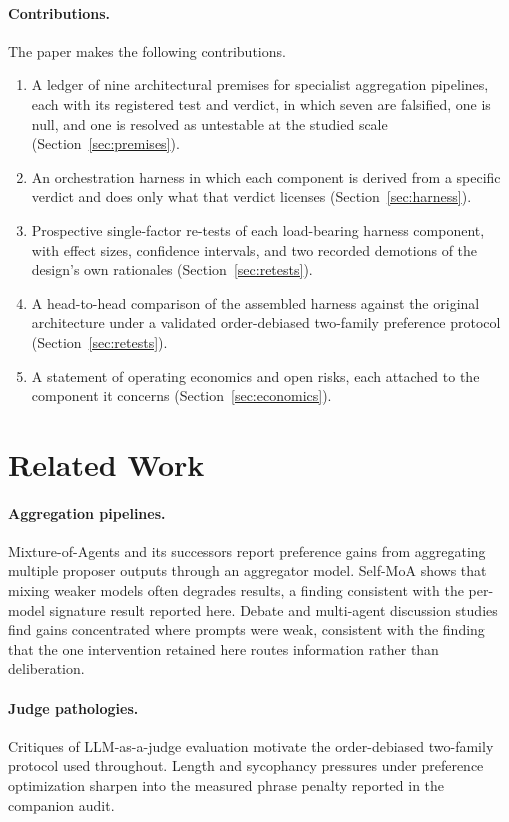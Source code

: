 \documentclass[11pt]{article}
\begin{document}
\paragraph{Contributions.} The paper makes the following contributions.
\begin{enumerate}
\item A ledger of nine architectural premises for specialist
aggregation pipelines, each with its registered test and verdict, in
which seven are falsified, one is null, and one is resolved as
untestable at the studied scale (Section~\ref{sec:premises}).
\item An orchestration harness in which each component is derived from
a specific verdict and does only what that verdict licenses
(Section~\ref{sec:harness}).
\item Prospective single-factor re-tests of each load-bearing harness
component, with effect sizes, confidence intervals, and two recorded
demotions of the design's own rationales (Section~\ref{sec:retests}).
\item A head-to-head comparison of the assembled harness against the
original architecture under a validated order-debiased two-family
preference protocol (Section~\ref{sec:retests}).
\item A statement of operating economics and open risks, each attached
to the component it concerns (Section~\ref{sec:economics}).
\end{enumerate}

\section{Related Work}
\label{sec:related}

\paragraph{Aggregation pipelines.} Mixture-of-Agents
\cite{wang2024moa} and its successors report preference gains from
aggregating multiple proposer outputs through an aggregator model.
Self-MoA \cite{li2025selfmoa} shows that mixing weaker models often
degrades results, a finding consistent with the per-model signature
result reported here. Debate and multi-agent discussion studies
\cite{wang2024rebuttal} find gains concentrated where prompts were
weak, consistent with the finding that the one intervention retained
here routes information rather than deliberation.

\paragraph{Judge pathologies.} Critiques of LLM-as-a-judge evaluation
\cite{zheng2023judging} motivate the order-debiased two-family
protocol used throughout. Length and sycophancy pressures under
preference optimization \cite{singhal2023length,sharma2023sycophancy}
sharpen into the measured phrase penalty reported in the companion
audit.
\end{document}
